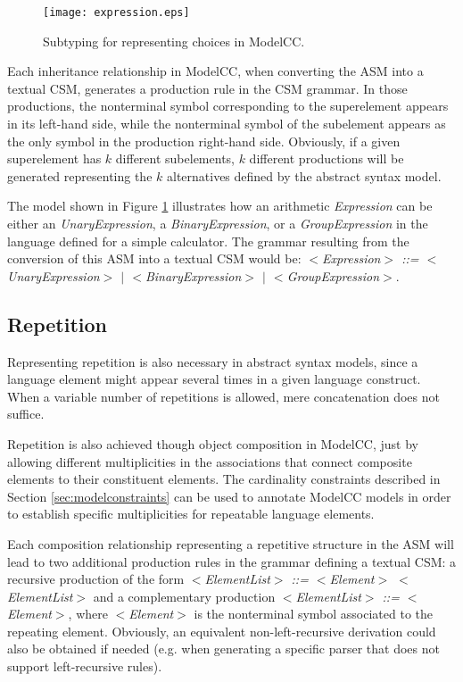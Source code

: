 \documentclass[preprint]{elsarticle}
\newcommand{\etexttt}[1]{\textit{#1}}
\begin{document}
\begin{figure}[tb!]
\centering
\texttt{[image: expression.eps]}
\caption{Subtyping for representing choices in ModelCC.} \label{fig:expression}
\end{figure}

Each inheritance relationship in ModelCC, when converting the ASM into a textual CSM, generates a production rule in the CSM grammar.
In those productions, the nonterminal symbol corresponding to the superelement appears in its left-hand side, while the nonterminal symbol of the subelement appears as the only symbol in the production right-hand side.
Obviously, if a given superelement has $k$ different subelements, $k$ different productions will be generated representing the $k$ alternatives defined by the abstract syntax model.

The model shown in Figure \ref{fig:expression} illustrates how an arithmetic \emph{Expression} can be either an \emph{UnaryExpression}, a \emph{BinaryExpression}, or a \emph{GroupExpression} in the language defined for a simple calculator.
The grammar resulting from the conversion of this ASM into a textual CSM would be: \etexttt{$<$Expression$>$ ::= $<$UnaryExpression$>$ $|$ $<$BinaryExpression$>$ $|$
$<$GroupExpression$>$}.

\subsection{Repetition}

Representing repetition is also necessary in abstract syntax models, since a language element might appear several times in a given language construct.
When a variable number of repetitions is allowed, mere concatenation does not suffice.

Repetition is also achieved though object composition in ModelCC, just by allowing different multiplicities in the associations that connect composite elements to their constituent elements.
The cardinality constraints described in Section \ref{sec:modelconstraints} can be used to annotate ModelCC models in order to establish specific multiplicities for repeatable language elements.

Each composition relationship representing a repetitive structure in the ASM will lead to two additional production rules in the grammar defining a textual CSM: a recursive production of the form \etexttt{$<$ElementList$>$ ::= $<$Element$>$ $<$ElementList$>$} and a complementary production \etexttt{$<$ElementList$>$ ::= $<$Element$>$}, where \etexttt{$<$Element$>$} is the nonterminal symbol associated to the repeating element.
Obviously, an equivalent non-left-recursive derivation could also be obtained if needed (e.g. when generating a specific parser that does not support left-recursive rules).
\end{document}
